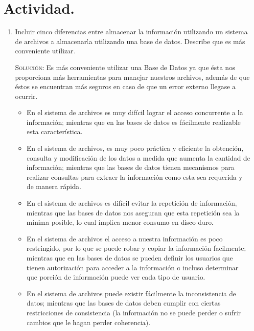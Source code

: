 \documentclass[letterpaper,12pt]{article}
\begin{document}
\section{Actividad.}

\begin{enumerate}
    \item Incluir cinco diferencias entre almacenar la información 
    utilizando un sistema de archivos a almacenarla utilizando una base de 
    datos. Describe que es más conveniente utilizar.

    \textsc{Solución:} Es más conveniente utilizar una Base de Datos ya que
    ésta nos proporciona más herramientas para manejar nuestros archivos, 
    además de que éstos se encuentran más seguros en caso de que un error 
    externo llegase a ocurrir. 

    
    \begin{itemize}
        \item En el sistema de archivos es muy difícil lograr el acceso 
        concurrente a la información; mientras que en las bases de datos 
        es fácilmente realizable esta característica.

        \item En el sistema de archivos, es muy poco práctica y eficiente 
        la obtención, consulta y modificación de los datos a medida que 
        aumenta la cantidad de información; mientras que las bases de datos 
        tienen mecanismos para realizar consultas para extraer la información 
        como esta sea requerida y de manera rápida.

        \item En el sistema de archivos es difícil evitar la repetición de 
        información, mientras que las bases de datos nos aseguran que esta 
        repetición sea la mínima posible, lo cual implica menor consumo en 
        disco duro.

        \item En el sistema de archivos el acceso a nuestra información es 
        poco restringido, por lo que se puede robar y copiar la información
        facilmente; mientras que en las bases de datos se pueden definir los 
        usuarios que tienen autorización para acceder a la información o 
        incluso determinar que porción de información puede ver cada tipo de 
        usuario.

        \item En el sistema de archivos puede existir fácilmente la 
        inconsistencia de datos; mientras que las bases de datos deben 
        cumplir con ciertas restricciones de consistencia (la información 
        no se puede perder o sufrir cambios que le hagan perder coherencia).
    \end{itemize}
    
\end{enumerate}
\end{document}
